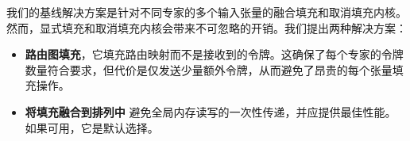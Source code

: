 我们的基线解决方案是针对不同专家的多个输入张量的融合填充和取消填充内核。然而，显式填充和取消填充内核会带来不可忽略的开销。我们提出两种解决方案：
\begin{itemize}
    \item \textbf{路由图填充}，它填充路由映射而不是接收到的令牌。这确保了每个专家的令牌数量符合要求，但代价是仅发送少量额外令牌，从而避免了昂贵的每个张量填充操作。
    \item \textbf{将填充融合到排列中} 避免全局内存读写的一次性传递，并应提供最佳性能。如果可用，它是默认选择。
\end{itemize}





